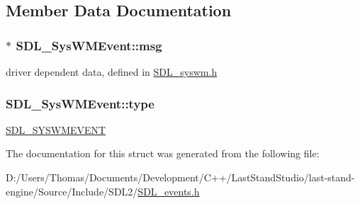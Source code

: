 \subsection{Member Data Documentation}
\hypertarget{structSDL__SysWMEvent_ad5e3dc68aa15582cd0641847d41c74e8}{}
\subsubsection[{msg}]{$\ast$ S\+D\+L\+\_\+\+Sys\+W\+M\+Event\+::msg}\label{structSDL__SysWMEvent_ad5e3dc68aa15582cd0641847d41c74e8}
driver dependent data, defined in \hyperlink{SDL__syswm_8h}{S\+D\+L\+\_\+syswm.\+h} \hypertarget{structSDL__SysWMEvent_a84697e96cb16bf6a570e10b5bfdcd392}{}
\subsubsection[{type}]{ S\+D\+L\+\_\+\+Sys\+W\+M\+Event\+::type}\label{structSDL__SysWMEvent_a84697e96cb16bf6a570e10b5bfdcd392}
\hyperlink{SDL__events_8h_a3b589e89be6b35c02e0dd34a55f3fccaa73749d735a18ce6ef17a09ee70d5dbe7}{S\+D\+L\+\_\+\+S\+Y\+S\+W\+M\+E\+V\+E\+N\+T} 

The documentation for this struct was generated from the following file\+:\begin{DoxyCompactItemize}
\item 
D\+:/\+Users/\+Thomas/\+Documents/\+Development/\+C++/\+Last\+Stand\+Studio/last-\/stand-\/engine/\+Source/\+Include/\+S\+D\+L2/\hyperlink{SDL__events_8h}{S\+D\+L\+\_\+events.\+h}\end{DoxyCompactItemize}
